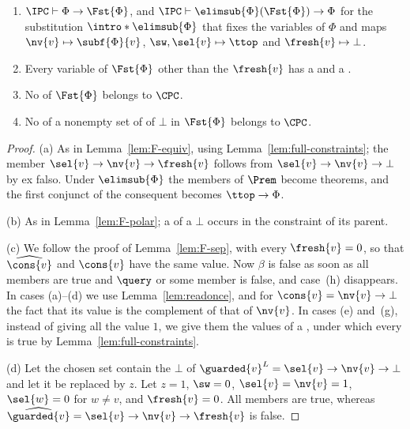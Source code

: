 \begin{lemma}\label{lem:full-F}
\leavevmode
\begin{enumerate}
\item[(a)] $\IPC\vdash\Phi\to\Fst{\Phi}$, and
  $\IPC\vdash\elimsub{\Phi}(\Fst{\Phi})\to\Phi$ for the substitution
  $\intro*\elimsub{\Phi}$ that fixes the variables of $\Phi$ and maps
  $\nv{v}\mapsto\subf{\Phi}{v}$, $\sw,\sel{v}\mapsto\ttop$ and
  $\fresh{v}\mapsto\bot$.
\item[(b)] Every variable of $\Fst{\Phi}$ other than the $\fresh{v}$ has a
   and a  .
\item[(c)] No  of $\Fst{\Phi}$ belongs to $\CPC$.
\item[(d)] No  of a nonempty set of  of
  $\bot$ in $\Fst{\Phi}$ belongs to $\CPC$.
\end{enumerate}
\end{lemma}
\begin{proof}
(a) As in Lemma~\ref{lem:F-equiv}, using Lemma~\ref{lem:full-constraints};
the  member $\sel{v}\to\nv{v}\to\fresh{v}$ follows from
$\sel{v}\to\nv{v}\to\bot$ by ex falso. Under $\elimsub{\Phi}$ the members of
$\Prem$ become theorems, and the first conjunct of the consequent becomes
$\ttop\to\Phi$.

(b) As in Lemma~\ref{lem:F-polar}; a  of a 
$\bot$ occurs in the constraint of its parent.

(c) We follow the proof of Lemma~\ref{lem:F-sep}, with every $\fresh{v}=0$,
so that $\widehat{\cons{v}}$ and $\cons{v}$ have the same value. Now
$\beta$ is false as soon as all  members are true and $\query$ or
some  member is false, and case~(h) disappears. In cases
(a)--(d) we use Lemma~\ref{lem:readonce}, and for $\cons{v}=\nv{v}\to\bot$
the fact that its value is the complement of that of $\nv{v}$. In cases
(e) and~(g), instead of giving all  the value $1$, we give
them the values of a , under which every  is true by Lemma~\ref{lem:full-constraints}.

(d) Let the chosen set contain the $\bot$ of $\guarded{v}^L=\sel{v}\to\nv{v}\to\bot$
and let it be replaced by $z$. Let $z=1$, $\sw=0$, $\sel{v}=\nv{v}=1$,
$\sel{w}=0$ for $w\ne v$, and $\fresh{v}=0$. All  members are true,
whereas $\widehat{\guarded{v}}=\sel{v}\to\nv{v}\to\fresh{v}$ is false.
\end{proof}

